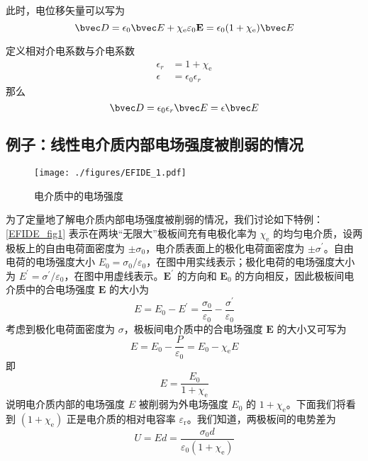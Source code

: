 此时，电位移矢量可以写为
$$
\bvec D = \epsilon_0 \bvec E + \chi_{\mathrm e} \varepsilon_{0} \mathbf E
= \epsilon_0(1+\chi_{\mathrm e}) \bvec E
$$

定义相对介电系数与介电系数
\begin{align}
\epsilon_r &= 1+\chi_{\mathrm e}\\
\epsilon &= \epsilon_0 \epsilon_r
\end{align}
那么
\begin{equation}
\bvec D = \epsilon_0 \epsilon_r \bvec E = \epsilon \bvec E 
\end{equation}

\subsection{例子：线性电介质内部电场强度被削弱的情况}
\begin{figure}[ht]
\centering
\texttt{[image: ./figures/EFIDE\_1.pdf]}
\caption{电介质中的电场强度} \label{EFIDE_fig1}
\end{figure}
为了定量地了解电介质内部电场强度被削弱的情况，我们讨论如下特例：\autoref{EFIDE_fig1} 表示在两块“无限大”极板间充有电极化率为 $\chi_\mathrm{e}$ 的均匀电介质，设两极板上的自由电荷面密度为 $\pm \sigma_0$，电介质表面上的极化电荷面密度为 $\pm \sigma^\prime$。自由电荷的电场强度大小 $E_{0}=\sigma_{0} / \varepsilon_{0}$，在图中用实线表示；极化电荷的电场强度大小为 $E^{\prime}=\sigma^{\prime} / \varepsilon_{0}$，在图中用虚线表示。$\mathbf E^\prime$ 的方向和 $\mathbf E_0$ 的方向相反，因此极板间电介质中的合电场强度 $\mathbf E $ 的大小为
\begin{equation}
E=E_{0}-E^{\prime}=\frac{\sigma_{0}}{\varepsilon_{0}}-\frac{\sigma^{\prime}}{\varepsilon_{0}}
\end{equation}
考虑到极化电荷面密度为 $\sigma$，极板间电介质中的合电场强度 $\mathbf E $ 的大小又可写为
\begin{equation}
E=E_{0}-\frac{P}{\varepsilon_{0}}=E_{0}-\chi_{\mathrm e} E
\end{equation}
即
\begin{equation} \label{EFIDE_eq1}
E=\frac{E_{0}}{1+\chi_{\mathrm{e}}}
\end{equation}
说明电介质内部的电场强度 $E $ 被削弱为外电场强度 $E_0$ 的 ${1+\chi_{\mathrm{e}}}$。下面我们将看到 $({1+\chi_{\mathrm{e}}})$ 正是电介质的相对电容率 $\varepsilon_\mathrm{r}$。我们知道，两极板间的电势差为
\begin{equation}
U=E d=\frac{\sigma_{0} d}{\varepsilon_{0}\left(1+\chi_{\mathrm e}\right)}
\end{equation}
